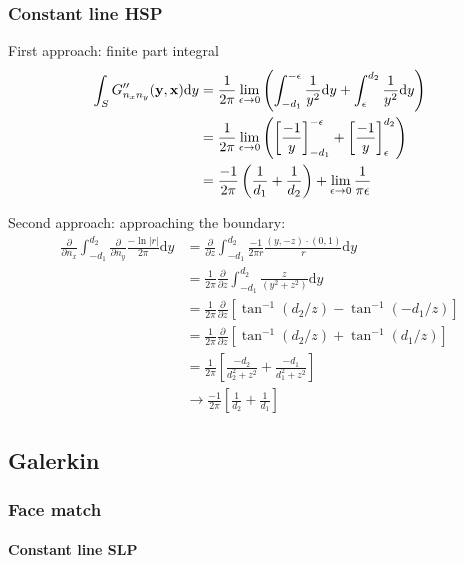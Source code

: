 \documentclass[a4paper,11pt]{article}
\newcommand{\td}{\mathrm{d}}
\begin{document}
\subsubsection{Constant line HSP}

First approach: finite part integral
%
\begin{align}
\int_{S} G''_{n_x n_y}({\bf y}, {\bf x}) \td y
&= \frac{1}{2\pi} \lim_{\epsilon \to 0} \left(\int_{-d_1}^{-\epsilon} \frac{1}{y^2}\td y + \int_{\epsilon}^{d_2} \frac{1}{y^2} \td y\right) \nonumber \\
&= \frac{1}{2\pi} \lim_{\epsilon \to 0} \left(\left[\frac{-1}{y}\right]_{-d_1}^{-\epsilon} +  \left[\frac{-1}{y}\right]_{\epsilon}^{d_2} \right)
\nonumber \\
&= \frac{-1}{2\pi} \left(\frac{1}{d_1} +  \frac{1}{d_2} \right) + \lim_{\epsilon \to 0} \frac{1}{\pi\epsilon}
\end{align}


Second approach: approaching the boundary:
%
\begin{align}
\frac{\partial}{\partial n_x}
\int_{-d_1}^{d_2} 
\frac{\partial}{\partial n_y}
\frac{-\ln |r|}{2\pi}
\td y 
&=
\frac{\partial}{\partial z}
\int_{-d_1}^{d_2} 
\frac{-1}{2\pi r} \frac{(y, -z) \cdot (0,1)}{r}
\td y \nonumber \\
&=
\frac{1}{2\pi} \frac{\partial}{\partial z}
\int_{-d_1}^{d_2} 
\frac{z}{\left(y^2+z^2\right)}
\td y \nonumber \\
&=
\frac{1}{2\pi} \frac{\partial}{\partial z}
\left[
\tan^{-1}\left(d_2/z\right)
-
\tan^{-1}\left(-d_1/z\right)
\right]
\nonumber \\
&=
\frac{1}{2\pi} \frac{\partial}{\partial z}
\left[
\tan^{-1}\left(d_2/z\right) + \tan^{-1}\left(d_1/z\right)
\right]
\nonumber \\
&=
\frac{1}{2\pi} 
\left[
\frac{-d_2}{d_2^2+z^2} + \frac{-d_1}{d_1^2+z^2}
\right]
\nonumber \\
& \to
\frac{-1}{2\pi} 
\left[
\frac{1}{d_2} + \frac{1}{d_1}
\right]
\end{align}


\subsection{Galerkin}

\subsubsection{Face match}

\paragraph{Constant line SLP}
\end{document}
